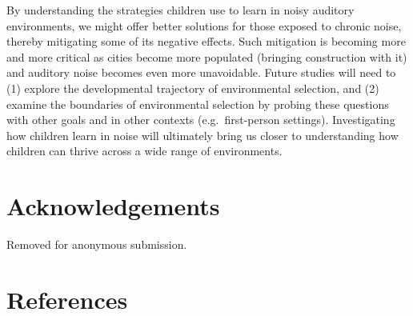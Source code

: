 \documentclass[10pt, letterpaper]{article}
\begin{document}
By understanding the strategies children use to learn in noisy auditory
environments, we might offer better solutions for those exposed to
chronic noise, thereby mitigating some of its negative effects. Such
mitigation is becoming more and more critical as cities become more
populated (bringing construction with it) and auditory noise becomes
even more unavoidable. Future studies will need to (1) explore the
developmental trajectory of environmental selection, and (2) examine the
boundaries of environmental selection by probing these questions with
other goals and in other contexts (e.g.~first-person settings).
Investigating how children learn in noise will ultimately bring us
closer to understanding how children can thrive across a wide range of
environments.

\hypertarget{acknowledgements}{%
\section{Acknowledgements}\label{acknowledgements}}

Removed for anonymous submission.

\hypertarget{references}{%
\section{References}\label{references}}

\setlength{\parindent}{-0.1in} 
\setlength{\leftskip}{0.125in}

\noindent
\end{document}
